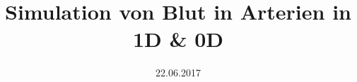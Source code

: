 \documentclass{beamer}
\title[Simulation von Blutfluss in Arterien]{Simulation von Blut in Arterien in 1D \& 0D}
\subtitle{}
\author{}
\date{22.06.2017}
\begin{document}
\begin{frame}[plain]
\maketitle
\end{frame}







\end{document}

